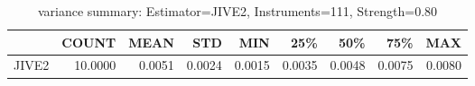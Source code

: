 \begin{table}[ht]
\centering
\caption{variance summary: Estimator=JIVE2, Instruments=111, Strength=0.80}
\begin{tabular}{lrrrrrrrr}
\toprule
 & COUNT & MEAN & STD & MIN & 25\% & 50\% & 75\% & MAX \\
\midrule
JIVE2 & 10.0000 & 0.0051 & 0.0024 & 0.0015 & 0.0035 & 0.0048 & 0.0075 & 0.0080 \\
\bottomrule
\end{tabular}
\end{table}
